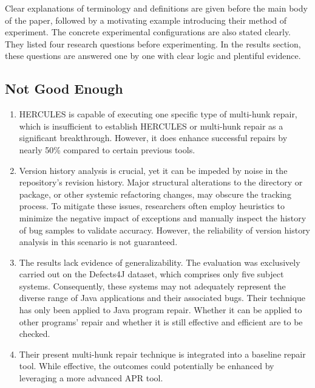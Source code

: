 \documentclass[runningheads]{llncs}
\begin{document}
Clear explanations of terminology and definitions are given before the main body of the paper, followed by a motivating example introducing their method of experiment. The concrete experimental configurations are also stated clearly.
They listed four research questions before experimenting. In the results section, these questions are answered one by one with clear logic and plentiful evidence.

\subsection{Not Good Enough}
\begin{enumerate}
\item HERCULES is capable of executing one specific type of multi-hunk repair, which is insufficient to establish HERCULES or multi-hunk repair as a significant breakthrough. However, it does enhance successful repairs by nearly 50\% compared to certain previous tools.\\
\item Version history analysis is crucial, yet it can be impeded by noise in the repository's revision history. Major structural alterations to the directory or package, or other systemic refactoring changes, may obscure the tracking process. To mitigate these issues, researchers often employ heuristics to minimize the negative impact of exceptions and manually inspect the history of bug samples to validate accuracy. However, the reliability of version history analysis in this scenario is not guaranteed.\\
\item The results lack evidence of generalizability. The evaluation was exclusively carried out on the Defects4J dataset, which comprises only five subject systems. Consequently, these systems may not adequately represent the diverse range of Java applications and their associated bugs. Their technique has only been applied to Java program repair. Whether it can be applied to other programs’ repair and whether it is still effective and efficient are to be checked.\\
\item Their present multi-hunk repair technique is integrated into a baseline repair tool. While effective, the outcomes could potentially be enhanced by leveraging a more advanced APR tool.
\end{enumerate}
\end{document}

